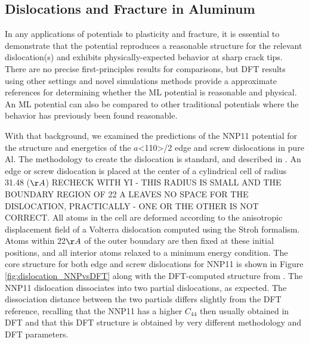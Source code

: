 \documentclass{article}
\begin{document}
\subsection{Dislocations and Fracture in Aluminum} \label{sct:fracture_dislocation}

In any applications of potentials to plasticity and fracture, it is essential to demonstrate that the potential reproduces a reasonable structure for the relevant dislocation(s) and exhibits physically-expected behavior at sharp crack tips.  There are no precise first-principles results for comparisons, but DFT results using other settings and novel simulations methods provide a approximate references for determining whether the ML potential is reasonable and physical.  An ML potential can also be compared to other traditional potentials where the behavior has previously been found reasonable.

With that background, we examined the predictions of the NNP11 potential for the structure and energetics of the $a$<110>/2 edge and screw dislocations in pure Al.
The methodology to create the dislocation is standard, and described in \cite{Hu2020AtomisticDynamics}.
An edge or screw dislocation is placed at the center of a cylindrical cell of radius 31.48 ($\AA$) RECHECK WITH YI - THIS RADIUS IS SMALL AND THE BOUNDARY REGION OF 22 A LEAVES NO SPACE FOR THE DISLOCATION, PRACTICALLY - ONE OR THE OTHER IS NOT CORRECT.
All atoms in the cell are deformed according to the anisotropic displacement field of a Volterra dislocation computed using the Stroh formalism\cite{Stroh1958DislocationsElasticity}.
Atoms within 22$\AA$ of the outer boundary are then fixed at these initial positions, and all interior atoms relaxed to a minimum energy condition.
The core structure for both edge and screw dislocations for NNP11 is shown in Figure \ref{fig:dislocation_NNPvsDFT} along with the DFT-computed structure from \cite{Woodward2008PredictionTheory}.
The NNP11 dislocation dissociates into two partial dislocations, as expected.
The dissociation distance between the two partials differs slightly from the DFT reference, recalling that the NNP11 has a higher $C_{44}$ then usually obtained in DFT and that this DFT structure is obtained by very different methodology and DFT parameters.
\end{document}
